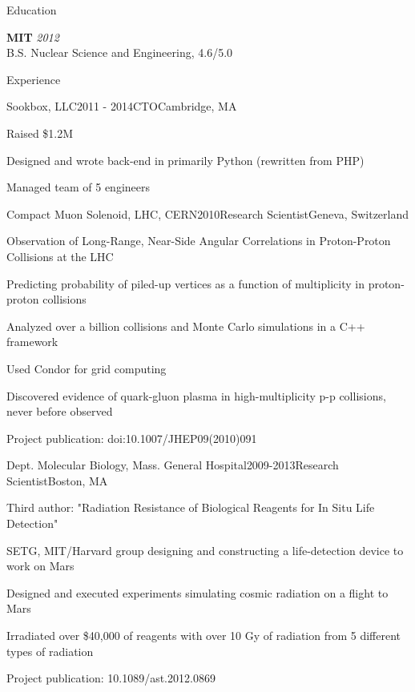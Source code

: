 \documentclass{resume}
\begin{document}

\begin{rSection}{Education}

{\bf MIT} \hfill {\em 2012} \\ 
B.S. Nuclear Science and Engineering, 4.6/5.0

\end{rSection}

\begin{rSection}{Experience}

\begin{rSubsection}{Sookbox, LLC}{2011 - 2014}{CTO}{Cambridge, MA}
\item Raised \$1.2M
\item Designed and wrote back-end in primarily Python (rewritten from PHP)
\item Managed team of 5 engineers

\end{rSubsection}


\begin{rSubsection}{Compact Muon Solenoid, LHC, CERN}{2010}{Research Scientist}{Geneva, Switzerland}
\item Observation of Long-Range, Near-Side Angular Correlations in Proton-Proton Collisions at the LHC
\item Predicting probability of piled-up vertices as a function of multiplicity in proton-proton collisions
\item Analyzed over a billion collisions and Monte Carlo simulations in a C++ framework
\item Used Condor for grid computing
\item Discovered evidence of quark-gluon plasma in high-multiplicity p-p collisions, never before observed
\item Project publication: doi:10.1007/JHEP09(2010)091

\end{rSubsection}


\begin{rSubsection}{Dept. Molecular Biology, Mass. General Hospital}{2009-2013}{Research Scientist}{Boston, MA}
\item Third author: "Radiation Resistance of Biological Reagents for In Situ Life Detection"
\item SETG, MIT/Harvard group designing and constructing a life-detection device to work on Mars
\item Designed and executed experiments simulating cosmic radiation on a flight to Mars
\item Irradiated over \$40,000 of reagents with over 10 Gy of radiation from 5 different types of radiation
\item Project publication: 10.1089/ast.2012.0869
\end{rSubsection}


\end{rSection}
\end{document}
